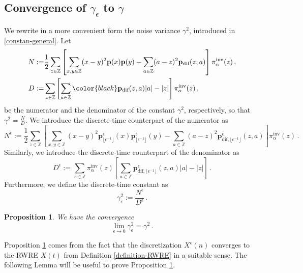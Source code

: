 \documentclass[a4paper,11pt,oneside,reqno]{amsart}
\newtheorem{proposition}[theorem]{Proposition}
\theoremstyle{definition}
\numberwithin{equation}{section}
\begin{document}
\subsection{Convergence of $\gamma_{\epsilon}$ to $\gamma$}
	We rewrite in a more convenient {\color{black}form} the noise variance $\gamma^{2}$, introduced in \eqref{constan-general}. Let 
\begin{align}
	N:=&\frac{1}{2}\sum_{z\in\mathbb{Z}}\left[\sum_{x,y\in \mathbb{Z}}(x-y)^{2}\mathbf{p}(x)\mathbf{p}(y)-\sum_{a\in \mathbb{Z}}(a-z)^{2}\mathbf{p}_{\text{dif}}(z,a)\right]\pi^{\text{inv}}_{\alpha}(z)\label{old-enne}\,,
	\\D:=&\sum_{z\in \mathbb{Z}}\left[\sum_{a\in \mathbb{Z}}{\color{black}\mathbf{p}_{\text{dif}}(z,a)}|a|-|z|\right]\pi^{\text{inv}}_{\alpha}(z)\,,\label{old-DI}
\end{align}
be the numerator and the denominator of the constant $\gamma^{2}$, respectively, so that  $\gamma^{2}=\frac{N}{D}$. 
	We introduce the discrete-time counterpart of the numerator as
	\begin{equation*}
		N^{\epsilon}:=\frac{1}{2}\sum_{z\in\mathbb{Z}}\left[\sum_{x,y\in \mathbb{Z}}(x-y)^{2}\mathbf{p}_{\lfloor \epsilon^{-1}\rfloor}^{\epsilon}(x)\mathbf{p}_{\lfloor \epsilon^{-1}\rfloor}^{\epsilon}(y)-\sum_{a\in \mathbb{Z}}(a-z)^{2}\mathbf{p}_{\text{dif},\lfloor \epsilon^{-1}\rfloor}^{\epsilon}(z,a)\right]\pi^{\text{inv}}_{\alpha}(z)\,.
	\end{equation*}
Similarly, we introduce the discrete-time counterpart of the denominator as 
\begin{equation*}
	D^{\epsilon}:=\sum_{z\in \mathbb{Z}}\pi^{\text{inv}}_{\alpha}(z)\left[\sum_{a\in \mathbb{Z}}\mathbf{p}_{\text{dif},\lfloor \epsilon^{-1}\rfloor}^{\epsilon}(z,a)|a|-|z|\right]\,.
\end{equation*}
Furthermore, we define the discrete-time constant as
\begin{equation}\label{epsilon-constant}
	\gamma_{\epsilon}^{2}:=\frac{N^{\epsilon}}{D^{\epsilon}}\,.
\end{equation}
\begin{proposition}\label{proposition-limit}
	We have the convergence
	\begin{equation*}
		\lim_{\epsilon\to 0}\gamma_{\epsilon}^{2}=\gamma^{2}\,.
	\end{equation*}
\end{proposition}
Proposition \ref{proposition-limit} comes from the fact that the discretization $X^{\epsilon}(n)$ converges to the RWRE  $X(t)$ from Definition \ref{definition-RWRE} in a suitable sense. The following Lemma will be useful {\color{black} to prove Proposition \ref{proposition-limit}}.
\end{document}
